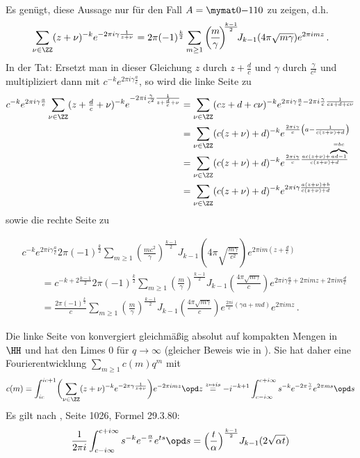 \begin{bewe}
\begin{bewe}
Es genügt, diese Aussage nur für den Fall $A = \mymat 0{-1}10$ zu zeigen, d.h.
\[
	\sum_{\nu \in \ZZ} (z + \nu)^{-k} e^{-2\pi i\gamma \frac{1}{z+\nu}} = 2\pi (-1)^{\frac k2} \sum_{m \geq 1} \left(\!\frac m\gamma\!\right)^{\!\!\frac{k-1}2} \!\! J_{k-1}(4\pi\sqrt{m\gamma}) e^{2\pi imz}
	\,.
\]
In der Tat: Ersetzt man in dieser Gleichung $z$ durch $z + \frac dc$ und $\gamma$ durch $\frac{\gamma}{c^2}$ und multipliziert dann mit $c^{-k} e^{2\pi i \gamma \frac ac}$, so wird die linke Seite zu
\begin{align*}
	c^{-k} e^{2\pi i\gamma \frac ac} \sum_{\nu \in \ZZ} (z + \tfrac dc + \nu)^{-k} e^{-2\pi i \frac{\gamma}{c^2} \frac{1}{z + \frac dc + \nu}} 
	&= \sum_{\nu \in \ZZ} (cz + d + c\nu)^{-k} e^{2\pi i\gamma \frac ac - 2\pi i \frac{\gamma}{c} \frac{1}{cz + d + c\nu}} \\
	&= \sum_{\nu \in \ZZ} (c(z + \nu) + d)^{-k} e^{\frac{2\pi i\gamma}c \left( a - \frac{1}{c(z + \nu) + d} \right)} \\[-12pt]
	&= \sum_{\nu \in \ZZ} (c(z + \nu) + d)^{-k} e^{\frac{2\pi i\gamma}c \frac{ac(z + \nu) + \overbrace{\scriptscriptstyle ad - 1}^{= bc}}{c(z + \nu) + d}} \\
	&= \sum_{\nu \in \ZZ} (c(z + \nu) + d)^{-k} e^{2\pi i\gamma \frac{a(z + \nu) + b}{c(z + \nu) + d}} \\
\end{align*}
sowie die rechte Seite zu

\begin{align*}
	&c^{-k} e^{2\pi i \gamma \frac ac} 2\pi (-1)^{\frac k2} \sum_{m\geq 1} \left(\!\frac {mc^2}{\gamma}\right)^{\!\!\frac {k-1}2} \!\! J_{k-1} \left(\! 4\pi \sqrt{\frac{m\gamma}{c^2}}\right) e^{2\pi i m(z + \frac dc)} \\
	&\qquad = c^{-k+2\frac{k-1}2} 2\pi (-1)^{\frac k2} \sum_{m\geq 1} \left(\!\frac {m}{\gamma}\!\right)^{\!\!\frac {k-1}2} \!\! J_{k-1} \left(\! \tfrac{4\pi \sqrt{m\gamma}}c\right) e^{2\pi i \gamma \frac ac + 2\pi i mz + 2\pi im\frac dc} \\
	&\qquad = \frac{2\pi (-1)^{\frac k2}}c \sum_{m\geq 1} \left(\!\frac {m}{\gamma}\!\right)^{\!\!\frac {k-1}2} \!\! J_{k-1} \left(\! \tfrac{4\pi \sqrt{m\gamma}}c\right) e^{\frac{2\pi i}c \left(\gamma a + md\right)} e^{2\pi i mz}
	\,.
\end{align*}


Die linke Seite von \myref{(**)} konvergiert gleichmäßig absolut auf kompakten Mengen in $\HH$ und hat den Limes 0 für $q\to \infty$ (gleicher Beweis wie in ).
Sie hat daher eine Fourierentwicklung $\sum_{m\geq 1} c(m) q^m$ mit
\[
	c(m) = \int_{ic}^{ic+1} \biggl( \sum_{\nu \in \ZZ} (z+\nu)^{-k} e^{-2\pi \gamma \frac{1}{z+\nu}} \biggr) e^{-2\pi imz} \opd z
	\stackrel{z \mapsto is}{=} -i^{-k+1} \int_{c-i \infty}^{c + i\infty} s^{-k} e^{-2\pi \frac{\gamma}{s}} e^{2\pi ms} \opd s
\]
Es gilt nach , Seite 1026, Formel 29.3.80:
\[
	\frac{1}{2\pi i} \int_{c-i\infty}^{c+i\infty} s^{-k} e^{-\frac{\alpha}{s}} e^{ts} \opd s = \Bigl(\frac{t}{\alpha}\Bigr)^{\frac{k-1}{2}} J_{k-1}(2\sqrt{\alpha t})
\]


\end{bewe}
\end{bewe}
